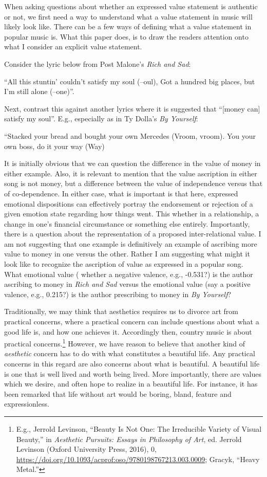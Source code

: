 \documentclass[phdthesis,12pt,final,a4paper]{wuthesis}
\theoremstyle{definition}
\theoremstyle{definition}
\theoremstyle{definition}
\theoremstyle{definition}
\theoremstyle{remark}
\begin{document}
When asking questions about whether an expressed value statement is authentic or not, we first need a way to understand what a value statement in music will likely look like. There can be a few ways of defining what a value statement in popular music is. What this paper does, is to draw the readers attention onto what I consider an explicit value statement.

Consider the lyric below from Post Malone's \emph{Rich and Sad}:

\label{stuntin}
``All this stuntin' couldn't satisfy my soul (--oul), Got a hundred big places, but I'm still alone (--one)''.

Next, contrast this against another lyrics where it is suggested that ``{[}money can{]} satisfy my soul''. E.g., especially as in Ty Dolla's \emph{By Yourself}:

\label{boss}
``Stacked your bread and bought your own Mercedes (Vroom, vroom). You your own boss, do it your way (Way)

It is initially obvious that we can question the difference in the value of money in either example. Also, it is relevant to mention that the value ascription in either song is not money, but a difference between the value of independence versus that of co-dependence. In either case, what is important is that here, expressed emotional dispositions can effectively portray the endorsement or rejection of a given emotion state regarding how things went. This whether in a relationship, a change in one's financial circumstance or something else entirely. Importantly, there is a question about the representation of a proposed inter-relational value. I am not suggesting that one example is definitively an example of ascribing more value to money in one versus the other. Rather I am suggesting what might it look like to recognize the ascription of value as expressed in a popular song. What emotional value ( whether a negative valence, e.g., -0.531?) is the author ascribing to money in \emph{Rich and Sad} versus the emotional value (say a positive valence, e.g., 0.215?) is the author prescribing to money in \emph{By Yourself}?

Traditionally, we may think that aesthetics requires us to divorce art from practical concerns, where a practical concern can include questions about what a good life is, and how one achieves it. Accordingly then, country music is about practical concerns.\footnote{E.g., Jerrold Levinson, {``Beauty Is {Not One}: {The Irreducible Variety} of {Visual Beauty},''} in \emph{Aesthetic {Pursuits}: {Essays} in {Philosophy} of {Art}}, ed. Jerrold Levinson (Oxford University Press, 2016), 0, \url{https://doi.org/10.1093/acprof:oso/9780198767213.003.0009}; Gracyk, {``Heavy Metal.''}} However, we have reason to believe that another kind of \emph{aesthetic} concern has to do with what constitutes a beautiful life. Any practical concerns in this regard are also concerns about what is beautiful. A beautiful life is one that is well lived and worth being lived. More importantly, there are values which we desire, and often hope to realize in a beautiful life. For instance, it has been remarked that life without art would be boring, bland, feature and expressionless.
\end{document}
